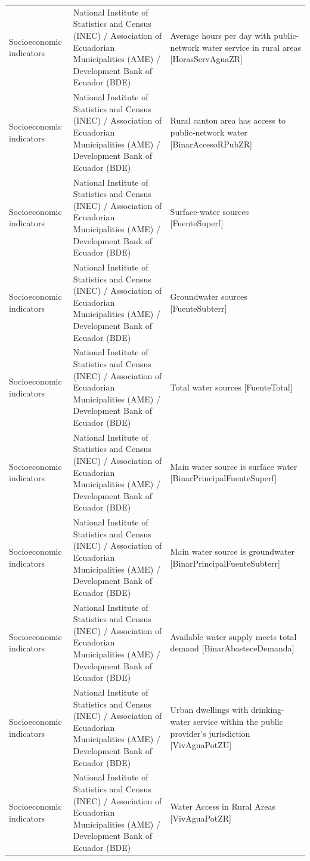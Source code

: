 \begin{landscape}
\begin{longtable}[t]{>{\raggedright\arraybackslash}p{3.4cm}>{\raggedright\arraybackslash}p{5.6cm}>{\raggedright\arraybackslash}p{12.4cm}}
Socioeconomic indicators & National Institute of Statistics and Census (INEC) / Association of Ecuadorian Municipalities (AME) / Development Bank of Ecuador (BDE) & Average hours per day with public-network water service in rural areas [HorasServAguaZR]\\
Socioeconomic indicators & National Institute of Statistics and Census (INEC) / Association of Ecuadorian Municipalities (AME) / Development Bank of Ecuador (BDE) & Rural canton area has access to public-network water [BinarAccesoRPubZR]\\
Socioeconomic indicators & National Institute of Statistics and Census (INEC) / Association of Ecuadorian Municipalities (AME) / Development Bank of Ecuador (BDE) & Surface-water sources [FuenteSuperf]\\
Socioeconomic indicators & National Institute of Statistics and Census (INEC) / Association of Ecuadorian Municipalities (AME) / Development Bank of Ecuador (BDE) & Groundwater sources [FuenteSubterr]\\
Socioeconomic indicators & National Institute of Statistics and Census (INEC) / Association of Ecuadorian Municipalities (AME) / Development Bank of Ecuador (BDE) & Total water sources [FuenteTotal]\\
Socioeconomic indicators & National Institute of Statistics and Census (INEC) / Association of Ecuadorian Municipalities (AME) / Development Bank of Ecuador (BDE) & Main water source is surface water [BinarPrincipalFuenteSu\allowbreak{}perf]\\
Socioeconomic indicators & National Institute of Statistics and Census (INEC) / Association of Ecuadorian Municipalities (AME) / Development Bank of Ecuador (BDE) & Main water source is groundwater [BinarPrincipalFuenteSu\allowbreak{}bterr]\\
Socioeconomic indicators & National Institute of Statistics and Census (INEC) / Association of Ecuadorian Municipalities (AME) / Development Bank of Ecuador (BDE) & Available water supply meets total demand [BinarAbasteceDemanda]\\
Socioeconomic indicators & National Institute of Statistics and Census (INEC) / Association of Ecuadorian Municipalities (AME) / Development Bank of Ecuador (BDE) & Urban dwellings with drinking-water service within the public provider's jurisdiction [VivAguaPotZU]\\
Socioeconomic indicators & National Institute of Statistics and Census (INEC) / Association of Ecuadorian Municipalities (AME) / Development Bank of Ecuador (BDE) & Water Access in Rural Areas [VivAguaPotZR]\\

\end{longtable}
\end{landscape}
